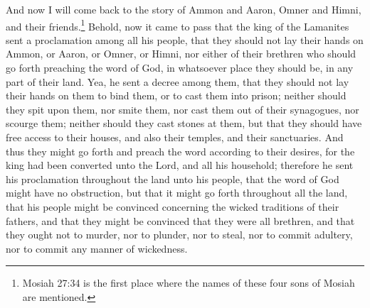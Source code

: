\bverse \iffalse And now I, after having said this, return again to the account of Ammon and Aaron, Omner and Himni, and their brethren. \fi
And now I will come back to the story of Ammon and Aaron, Omner and Himni, and their friends.\footnote{Mosiah 27:34 is the first place where the names of these four sons of Mosiah are mentioned.}
\bchapter
\bverse \iffalse Behold, now it came to pass that the king of the Lamanites sent a proclamation among all his people, that they should not lay their hands on Ammon, or Aaron, or Omner, or Himni, nor either of their brethren who should go forth preaching the word of God, in whatsoever place they should be, in any part of their land. \fi
Behold, now it came to pass that the king of the Lamanites sent a proclamation among all his people, that they should not lay their hands on Ammon, or Aaron, or Omner, or Himni, nor either of their brethren who should go forth preaching the word of God, in whatsoever place they should be, in any part of their land.
\bverse \iffalse Yea, he sent a decree among them, that they should not lay their hands on them to bind them, or to cast them into prison; neither should they spit upon them, nor smite them, nor cast them out of their synagogues, nor scourge them; neither should they cast stones at them, but that they should have free access to their houses, and also their temples, and their sanctuaries. \fi
Yea, he sent a decree among them, that they should not lay their hands on them to bind them, or to cast them into prison; neither should they spit upon them, nor smite them, nor cast them out of their synagogues, nor scourge them; neither should they cast stones at them, but that they should have free access to their houses, and also their temples, and their sanctuaries.
\bverse \iffalse And thus they might go forth and preach the word according to their desires, for the king had been converted unto the Lord, and all his household; therefore he sent his proclamation throughout the land unto his people, that the word of God might have no obstruction, but that it might go forth throughout all the land, that his people might be convinced concerning the wicked traditions of their fathers, and that they might be convinced that they were all brethren, and that they ought not to murder, nor to plunder, nor to steal, nor to commit adultery, nor to commit any manner of wickedness. \fi
And thus they might go forth and preach the word according to their desires, for the king had been converted unto the Lord, and all his household; therefore he sent his proclamation throughout the land unto his people, that the word of God might have no obstruction, but that it might go forth throughout all the land, that his people might be convinced concerning the wicked traditions of their fathers, and that they might be convinced that they were all brethren, and that they ought not to murder, nor to plunder, nor to steal, nor to commit adultery, nor to commit any manner of wickedness.
